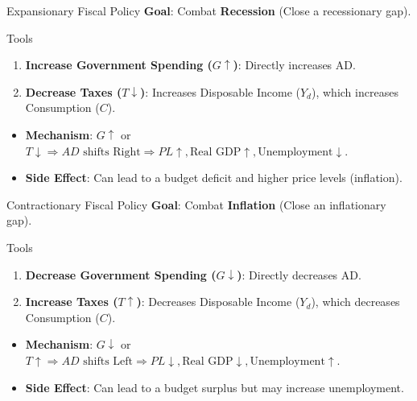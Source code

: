 \documentclass{beamer}
\begin{document}
\begin{frame}{Expansionary Fiscal Policy}
    \textbf{Goal}: Combat \textbf{Recession} (Close a recessionary gap).
    \begin{block}{Tools}
        \begin{enumerate}
            \item \textbf{Increase Government Spending ($G \uparrow$)}: Directly increases AD.
            \item \textbf{Decrease Taxes ($T \downarrow$)}: Increases Disposable Income ($Y_d$), which increases Consumption ($C$).
        \end{enumerate}
    \end{block}
    \begin{itemize}
        \item \textbf{Mechanism}: $G \uparrow$ or $T \downarrow \Rightarrow AD \text{ shifts Right} \Rightarrow PL \uparrow, \text{Real GDP} \uparrow, \text{Unemployment} \downarrow$.
        \item \textbf{Side Effect}: Can lead to a budget deficit and higher price levels (inflation).
    \end{itemize}
\end{frame}

\begin{frame}{Contractionary Fiscal Policy}
    \textbf{Goal}: Combat \textbf{Inflation} (Close an inflationary gap).
    \begin{block}{Tools}
        \begin{enumerate}
            \item \textbf{Decrease Government Spending ($G \downarrow$)}: Directly decreases AD.
            \item \textbf{Increase Taxes ($T \uparrow$)}: Decreases Disposable Income ($Y_d$), which decreases Consumption ($C$).
        \end{enumerate}
    \end{block}
    \begin{itemize}
        \item \textbf{Mechanism}: $G \downarrow$ or $T \uparrow \Rightarrow AD \text{ shifts Left} \Rightarrow PL \downarrow, \text{Real GDP} \downarrow, \text{Unemployment} \uparrow$.
        \item \textbf{Side Effect}: Can lead to a budget surplus but may increase unemployment.
    \end{itemize}
\end{frame}
\end{document}

